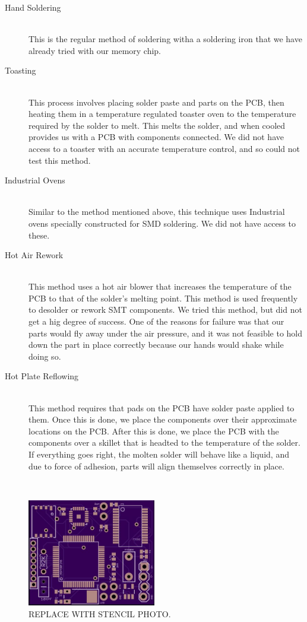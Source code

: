 \begin{description}

	\item[Hand Soldering] \hfill \\
	This is the regular method of soldering witha a soldering iron that we have already tried with our memory chip.
	\item[Toasting] \hfill \\
	This process involves placing solder paste and parts on the PCB,
	then heating them in a temperature regulated toaster oven to the temperature required by the solder to melt.
	This melts the solder, and when cooled provides us with a PCB with components connected.
	We did not have access to a toaster with an accurate temperature control,
	and so could not test this method.
	\item[Industrial Ovens] \hfill \\
	Similar to the method mentioned above,
	this technique uses Industrial ovens specially constructed for SMD soldering.
	We did not have access to these.
	\item[Hot Air Rework] \hfill \\
	This method uses a hot air blower that increases the temperature of the PCB to that of the solder's melting point.
	This method is used frequently to desolder or rework SMT components.
	We tried this method,
	but did not get a hig degree of success.
	One of the reasons for failure was that our parts would fly away under the air pressure,
	and it was not feasible to hold down the part in place correctly because our hands would shake while doing so.
	\item[Hot Plate Reflowing] \hfill \\
	This method requires that pads on the PCB have solder paste applied to them.
	Once this is done,
	we place the components over their approximate locations on the PCB.
	After this is done,
	we place the PCB with the components over a skillet that is headted to the temperature of the solder.
	If everything goes right,
	the molten solder will behave like a liquid,
	and due to force of adhesion,
	parts will align themselves correctly in place.
\end{description}
\hfill \\
\begin{figure}
\begin{center}
\includegraphics[width=0.5\textwidth]{images/PCBBare.jpg}
\caption{REPLACE WITH STENCIL PHOTO.}
\label{Fig:Stencil}
\end{center}
\end{figure}
